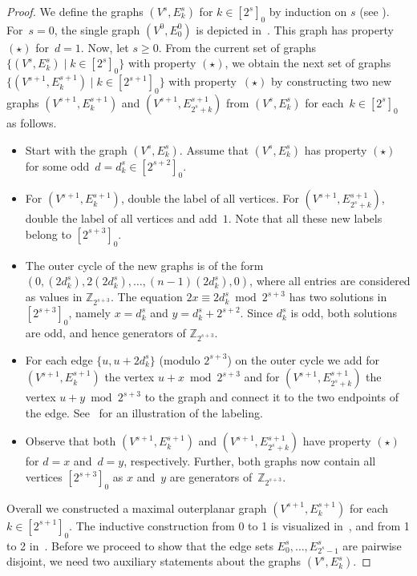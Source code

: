 \documentclass[unicode,runningheads,envcountsame,a4paper,dvipsnames,12pt]{llncs}
\newcommand{\Z}{\mathbb{Z}}
\begin{document}
\begin{proof}
		We define the graphs \((V^s,E^s_k)\) for \(k \in [2^s]_0\) by induction on \(s\) (see ). For~\(s=0\), the single graph \((V^0,E^0_0)\) is depicted in~. This graph has property~\((\star)\) for~\(d=1\). 
		Now, let $s \ge 0$. From the current set of graphs $\{(V^{s}, E_{k}^{s}) \mid k \in [2^{s}]_{0}\}$ with property $(\star)$,
		we obtain the next set of graphs $\{(V^{s+1}, E_{k}^{s+1}) \mid k \in [2^{s+1}]_{0}\}$ with property~$(\star)$
		by constructing two new graphs $(V^{s+1}, E_{k}^{s+1})$ and $(V^{s+1}, E_{2^{s}+k}^{s+1})$ from $(V^{s}, E_{k}^{s})$ for each~$k \in [2^{s}]_{0}$ as follows.
		\begin{itemize}
			\item Start with the graph \((V^s,E_k^s)\). Assume that $(V^{s}, E_{k}^{s})$ has property $(\star)$ for some odd~$d = d_{k}^{s} \in [2^{s+2}]_{0}$.
			\item For $(V^{s+1}, E_{k}^{s+1})$, double the label of all vertices. For $(V^{s+1}, E_{2^{s}+k}^{s+1})$, double the label of all vertices and add~$1$. Note that all these new labels belong to \([2^{s+3}]_0\).
			\item The outer cycle of the new graphs is of the form $(0, (2d_k^s), 2(2d_k^s), \dots, (n-1)(2d_k^s), 0)$, where all entries are considered as values in \(\Z_{2^{s+3}}\).
			The equation \(2x \equiv 2d_k^s \bmod 2^{s+3}\) has two solutions in \([2^{s+3}]_0\), namely \(x=d_k^s\) and \(y=d_k^s+2^{s+2}\). Since \(d_k^s\) is odd, both solutions are odd, and hence generators of \(\Z_{2^{s+3}}\).
			\item For each edge \(\{u,u+2d_k^s\}\) (modulo \(2^{s+3}\)) on the outer cycle we add for $(V^{s+1}, E_{k}^{s+1})$ the vertex \(u+x \bmod 2^{s+3}\) and for $(V^{s+1}, E_{2^{s}+k}^{s+1})$ the vertex \(u+y \bmod 2^{s+3}\) to the graph and connect it to the two endpoints of the edge. See~ for an illustration of the labeling.
			\item Observe that both $(V^{s+1}, E_{k}^{s+1})$ and $(V^{s+1}, E_{2^{s}+k}^{s+1})$ have property \((\star)\) for $d = x$ and~$d = y$, respectively. 
			Further, both graphs now contain all vertices \([2^{s+3}]_0\) as \(x\) and~\(y\) are generators of~\(\Z_{2^{s+3}}\).
		\end{itemize}
		Overall we constructed a maximal outerplanar graph \((V^{s+1},E_k^{s+1})\)  for each \({k \in [2^{s+1}]_0}\). The inductive construction from 0 to 1 is visualized in~, and from 1 to 2 in~. Before we proceed to show that the edge sets \(E^s_0, \dots, E^{s}_{2^s-1}\) are pairwise disjoint, we need two auxiliary statements about the graphs \((V^s,E_k^s)\).
		

\end{proof}
\end{document}
